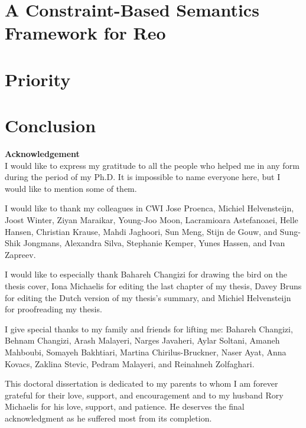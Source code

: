 \documentclass[runnngheads]{book}
\begin{document}
\chapter{A Constraint-Based Semantics Framework for Reo}
\label{chapterCASM}

\chapter{Priority}
\label{ch:prio}

\chapter{Conclusion}
\label{ch:concl}
\singlespacing

\clearpage


\newpage


\newpage
{\textbf{\Large{Acknowledgement}}}
\vspace*{1cm}
\\
I would like to express my gratitude to all the people who helped me in any form during the period of my Ph.D. It is impossible to name everyone here, but I would like to mention some of them.

I would like to thank my colleagues in CWI Jose Proenca, Michiel Helvensteijn, Joost Winter, Ziyan Maraikar, Young-Joo Moon, Lacramioara Astefanoaei, Helle Hansen, Christian Krause, Mahdi Jaghoori, Sun Meng, Stijn de Gouw, and Sung-Shik Jongmans, Alexandra Silva, Stephanie Kemper, Yunes Hassen, and Ivan Zapreev.

I would like to especially thank Bahareh Changizi for drawing the bird on the thesis cover, Iona Michaelis for editing the last chapter of my thesis, Davey Bruns for editing the Dutch version of my thesis's summary, and Michiel Helvensteijn for proofreading my thesis.

I give special thanks to my family and friends for lifting me: Bahareh Changizi,  Behnam Changizi, Arash Malayeri, Narges Javaheri, Aylar Soltani, Amaneh Mahboubi, Somayeh Bakhtiari, Martina Chirilus-Bruckner, Naser Ayat, Anna Kovacs, Zaklina Stevic, Pedram Malayeri, and Reinahneh Zolfaghari.

This doctoral dissertation is dedicated to my parents to whom I am forever grateful for their love, support, and encouragement and to my husband Rory Michaelis for his love, support, and patience. He
deserves the final acknowledgment as he suffered most from its completion.


\end{document}
